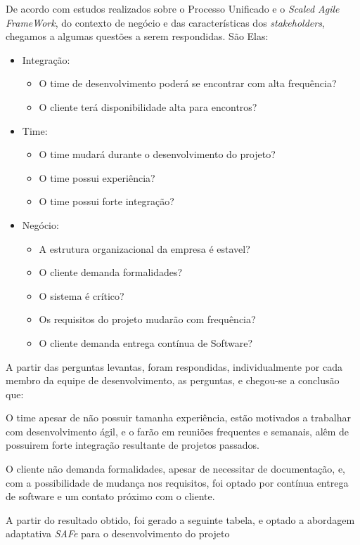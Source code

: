 	De acordo com estudos realizados sobre o Processo Unificado e o \textit{Scaled Agile FrameWork}, do contexto de negócio e das características dos \textit{stakeholders}, chegamos a algumas questões a serem respondidas. São Elas:
	\begin{itemize}
		\item Integração:
			\begin{itemize}
			\item O time de desenvolvimento poderá se encontrar com alta frequência?
			\item O cliente terá disponibilidade alta para encontros?
		\end{itemize}
		\item Time:
		\begin{itemize}
			\item O time mudará durante o desenvolvimento do projeto?
			\item O time possui experiência?
			\item O time possui forte integração?
		\end{itemize}

		\item Negócio:
		\begin{itemize}
			\item A estrutura organizacional da empresa é estavel?
			\item O cliente demanda formalidades?
			\item O sistema é crítico?
			\item Os requisitos do projeto mudarão com frequência?
			\item O cliente demanda entrega contínua de Software?
		\end{itemize}
	\end{itemize}
	\par
	A partir das perguntas levantas, foram respondidas, individualmente por cada membro da equipe de desenvolvimento, as perguntas, e chegou-se a conclusão que: \par O time apesar de não possuir tamanha experiência, estão motivados a trabalhar com desenvolvimento ágil, e o farão em reuniões frequentes e semanais, alêm de possuirem forte integração resultante de projetos passados. \par
	O cliente não demanda formalidades, apesar de necessitar de documentação, e, com a possibilidade de mudança nos requisitos, foi optado por contínua entrega de software e um contato próximo com o cliente.
	\par A partir do resultado obtido, foi gerado a seguinte tabela, e optado a abordagem adaptativa \textit{SAFe} para o desenvolvimento do projeto



